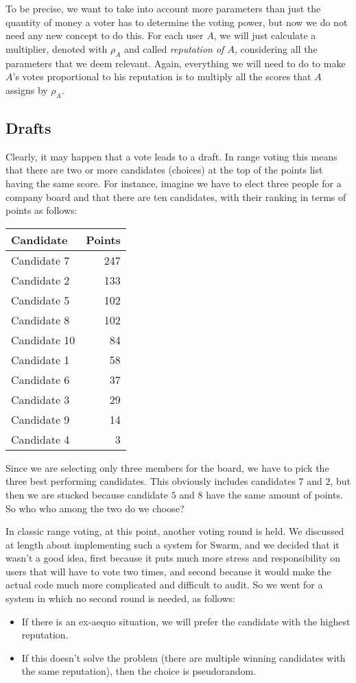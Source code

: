 \documentclass[submission, copyright,creativecommons,sharealike,noncommercial]{eptcs}
\begin{document}
	To be precise, we want to take into account more parameters than just the quantity of money a voter has to determine the voting power, but now we do not need any new concept to do this. For each user $A$, we will just calculate a multiplier, denoted with $\rho_A$ and called \emph{reputation of $A$}, considering all the parameters that we deem relevant. Again, everything we will need to do to make $A$'s votes proportional to his reputation is to multiply all the scores that $A$ assigns by $\rho_A$.
%
%
\subsection{Drafts}\label{subsec:Drafts}
%
	Clearly, it may happen that a vote leads to a draft. In range voting this means that there are two or more candidates (choices) at the top of the points list having the same score. For instance, imagine we have to elect three people for a company board and that there are ten candidates, with their ranking in terms of points as follows:
	\begin{center}
	\begin{tabular}{| l | r |}
		\hline
		\textbf{Candidate} & \textbf{Points}\\
		\hline			
		Candidate 7 & 247\\
		Candidate 2 & 133\\
		Candidate 5 & 102\\
		Candidate 8 & 102\\
		Candidate 10 & 84\\
		Candidate 1 & 58\\
		Candidate 6 & 37\\
		Candidate 3 & 29\\
		Candidate 9 & 14\\
		Candidate 4 & 3\\
		\hline  
	\end{tabular}
	\end{center}
%
	Since we are selecting only three members for the board, we have to pick the three best performing candidates. This obviously includes candidates $7$ and $2$, but then we are stucked because candidate $5$ and $8$ have the same amount of points. So who who among the two do we choose?
	
	In classic range voting, at this point, another voting round is held. We discussed at length about implementing such a system for Swarm, and we decided that it wasn't a good idea, first because it puts much more stress and responsibility on users that will have to vote two times, and second because it would make the actual code much more complicated and difficult to audit. So we went for a system in which no second round is needed, as follows:
	\begin{itemize}
		\item If there is an ex-aequo situation, we will prefer the candidate with the highest reputation.
		\item If this doesn't solve the problem (there are multiple winning candidates with the same reputation), then the choice is pseudorandom.
	\end{itemize}
%
%
\end{document}
